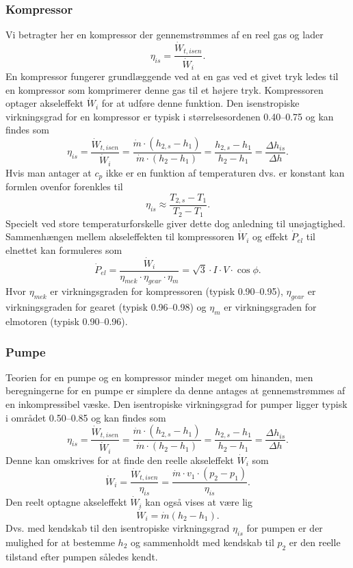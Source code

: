 \subsubsection{Kompressor}
Vi betragter her en kompressor der gennemstrømmes af en reel gas og lader
\[ 
\eta_{is} = \frac{\dot{W}_{t, isen}}{\dot{W}_i}
.\]
En kompressor fungerer grundlæggende ved at en gas ved et givet tryk ledes til en kompressor som komprimerer denne gas til et højere tryk. Kompressoren optager akseleffekt $\dot{W}_i$ for at udføre denne funktion. Den isenstropiske virkningsgrad for en kompressor er typisk i størrelsesordenen \num{0,40}--\num{0,75} og kan findes som
\[ 
\eta_{is} = \frac{\dot{W}_{t,isen}}{\dot{W}_i} = \frac{\dot{m} \cdot \left( h_{2,s} - h_1 \right)}{\dot{m} \cdot (h_{2} - h_1)} = \frac{h_{2,s} - h_1}{h_2 - h_1} = \frac{\Delta h_{is}}{\Delta h}
.\]
Hvis man antager at $c_p$ ikke er en funktion af temperaturen dvs. er konstant kan formlen ovenfor forenkles til
\[ 
\eta_{is} \approx \frac{T_{2,s} - T_1}{T_2 - T_1}
.\]
Specielt ved store temperaturforskelle giver dette dog anledning til unøjagtighed. Sammenhængen mellem akseleffekten til kompressoren $\dot{W}_i$ og effekt $\dot{P}_{el}$ til elnettet kan formuleres som
\[ 
\dot{P}_{el} = \frac{\dot{W}_i}{\eta_{mek}\cdot \eta_{gear} \cdot \eta_{m}} = \sqrt{3} \cdot I \cdot V \cdot \cos\phi
.\]
Hvor $\eta_{mek}$ er virkningsgraden for kompressoren (typisk \num{0,90}--\num{0,95}), $\eta_{gear}$ er virkningsgraden for gearet (typisk \num{0,96}--\num{0,98}) og $\eta_m$ er virkningsgraden for elmotoren (typisk \num{0,90}--\num{0,96}).

\subsubsection{Pumpe}
Teorien for en pumpe og en kompressor minder meget om hinanden, men beregningerne for en pumpe er simplere da denne antages at gennemstrømmes af en inkompressibel væske. Den isentropiske virkningsgrad for pumper ligger typisk i området \num{0,50}--\num{0,85} og kan findes som
\[ 
\eta_{is} = \frac{\dot{W}_{t,isen}}{\dot{W}_i} = \frac{\dot{m} \cdot (h_{2,s} - h_1)}{\dot{m} \cdot (h_2 - h_1)} = \frac{h_{2,s} - h_1}{h_2 - h_1} = \frac{\Delta h_{is}}{\Delta h}
.\]
Denne kan omskrives for at finde den reelle akseleffekt $\dot{W}_i$ som
\[ 
\dot{W}_i = \frac{\dot{W}_{t,isen}}{\eta_{is}} = \frac{\dot{m}\cdot v_1 \cdot (p_2 - p_1)}{\eta_{is}}
.\]
Den reelt optagne akseleffekt $\dot{W}_i$ kan også vises at være lig
\[ 
\dot{W}_i = \dot{m} (h_2 - h_1)
.\]
Dvs. med kendskab til den isentropiske virkningsgrad $\eta_{is}$ for pumpen er der mulighed for at bestemme $h_2$ og sammenholdt med kendskab til $p_2$ er den reelle tilstand efter pumpen således kendt.

